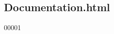 \hypertarget{_documentation_8html_source}{
\subsection{Documentation.html}
}

\begin{DoxyCode}
00001 
\end{DoxyCode}
